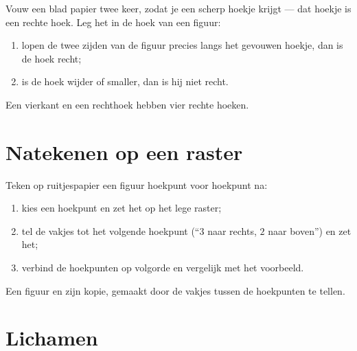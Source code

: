\begin{method}\label{met:g2:shapes:rightangle}
Vouw een blad papier twee keer, zodat je een scherp hoekje krijgt ---
dat hoekje is een rechte hoek. Leg het in de hoek van een figuur:
\begin{enumerate}
  \item lopen de twee zijden van de figuur precies langs het gevouwen
        hoekje, dan is de hoek recht;
  \item is de hoek wijder of smaller, dan is hij niet recht.
\end{enumerate}
Een vierkant en een rechthoek hebben vier rechte hoeken.
\end{method}

\section{Natekenen op een raster}

\begin{method}\label{met:g2:shapes:copy}
Teken op ruitjespapier een figuur hoekpunt voor hoekpunt na:
\begin{enumerate}
  \item kies een hoekpunt en zet het op het lege raster;
  \item tel de vakjes tot het volgende hoekpunt (``$3$ naar rechts, $2$
        naar boven'') en zet het;
  \item verbind de hoekpunten op volgorde en vergelijk met het
        voorbeeld.
\end{enumerate}
\end{method}

\begin{omfigure}

{\small Een figuur en zijn kopie, gemaakt door de vakjes tussen de
hoekpunten te tellen.}
\end{omfigure}

\section{Lichamen}

